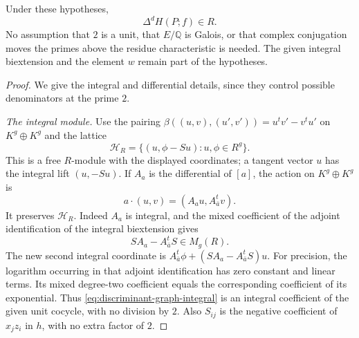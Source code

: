 \begin{theorem}\label{thm:discriminant-harmonic-clearing}
Under these hypotheses,
\[
                  \Delta^d H(P;f)\in R.
\]
No assumption that $2$ is a unit, that $E/\mathbb Q$ is Galois, or that
complex conjugation moves the primes above the residue characteristic is
needed.  The given integral biextension and the element $w$ remain part of
the hypotheses.
\end{theorem}

\begin{proof}
We give the integral and differential details, since they control possible
denominators at the prime $2$.

\emph{The integral module.}
Use the pairing
$\beta((u,v),(u',v'))=u^t v'-v^t u'$ on $K^g\oplus K^g$ and the lattice
\[
             \mathcal H_R=\{(u,\phi-Su):u,\phi\in R^g\}.
\]
This is a free $R$-module with the displayed coordinates; a tangent vector
$u$ has the integral lift $(u,-Su)$.  If $A_a$ is the differential of $[a]$,
the action on $K^g\oplus K^g$ is
\[
             a\cdot(u,v)=(A_a u,A_{\bar a}^{t}v).
\]
It preserves $\mathcal H_R$.  Indeed $A_a$ is integral, and the mixed
coefficient of the adjoint identification of the integral biextension gives
\begin{equation}\label{eq:discriminant-graph-integral}
                    S A_a-A_{\bar a}^{t}S\in M_g(R).
\end{equation}
The new second integral coordinate is
$A_{\bar a}^{t}\phi+(S A_a-A_{\bar a}^{t}S)u$.
For precision, the logarithm occurring in that adjoint identification has
zero constant and linear terms.  Its mixed degree-two coefficient equals
the corresponding coefficient of its exponential.  Thus
\eqref{eq:discriminant-graph-integral} is an integral coefficient of the
given unit cocycle, with no division by $2$.  Also $S_{ij}$ is the negative
coefficient of $x_jz_i$ in $h$, with no extra factor of $2$.


\end{proof}

